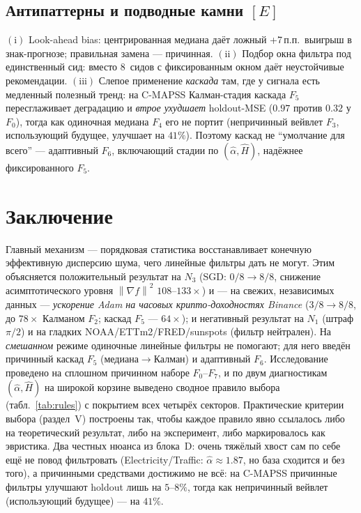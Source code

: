 \documentclass[conference]{IEEEtran}
\theoremstyle{plain}
\theoremstyle{definition}
\newcommand{\norm}[1]{\left\lVert#1\right\rVert}
\begin{document}
\subsection{Антипаттерны и подводные камни $[E]$}
$(\mathrm{i})$ Look-ahead bias: центрированная медиана даёт ложный
+7\,п.п.\ выигрыш в знак-прогнозе; правильная замена --- причинная.
$(\mathrm{ii})$ Подбор окна фильтра под единственный сид: вместо
$8$~сидов с фиксированным окном даёт неустойчивые рекомендации.
$(\mathrm{iii})$ Слепое применение \emph{каскада} там, где у сигнала
есть медленный полезный тренд: на C-MAPSS Калман-стадия каскада $F_5$
пересглаживает деградацию и \emph{втрое ухудшает} holdout-MSE ($0.97$
против $0.32$ у $F_0$), тогда как одиночная медиана $F_4$ его не портит
(непричинный вейвлет $F_3$, использующий будущее, улучшает на $41\%$).
Поэтому каскад не ``умолчание для всего'' --- адаптивный $F_6$,
включающий стадии по $(\hat\alpha,\hat H)$, надёжнее фиксированного $F_5$.

\section{Заключение}

Главный механизм --- порядковая статистика восстанавливает конечную
эффективную дисперсию шума, чего линейные фильтры дать не могут.
Этим объясняется положительный результат на $N_3$ (SGD: $0/8\to8/8$,
снижение асимптотического уровня $\norm{\nabla f}^2$ $108$--$133\times$) и --- на свежих, независимых данных ---
\emph{ускорение Adam на часовых крипто-доходностях Binance}
($3/8\to8/8$, до $78\times$ Калманом $F_2$; каскад $F_5$ --- $64\times$); и негативный результат на
$N_1$ (штраф $\pi/2$) и на гладких NOAA/ETTm2/FRED/sunspots (фильтр
нейтрален). На \emph{смешанном} режиме одиночные линейные
фильтры не помогают; для него введён причинный каскад $F_5$
(медиана$\to$Калман) и адаптивный $F_6$. Исследование проведено на
сплошном причинном наборе $F_0$--$F_7$, и по двум диагностикам $(\hat\alpha,\hat H)$ на широкой корзине выведено
сводное правило выбора (табл.~\ref{tab:rules}) с покрытием всех четырёх
секторов. Практические критерии
выбора (раздел~V) построены так, чтобы каждое правило явно ссылалось
либо на теоретический результат, либо на эксперимент, либо
маркировалось как эвристика. Два честных нюанса из блока~D: очень
тяжёлый хвост сам по себе ещё не повод фильтровать (Electricity/Traffic:
$\hat\alpha\approx1.87$, но база сходится и без того), а
причинными средствами достижимо не всё: на C-MAPSS причинные фильтры
улучшают holdout лишь на $5$--$8\%$, тогда как непричинный вейвлет
(использующий будущее) --- на $41\%$.



\end{document}
